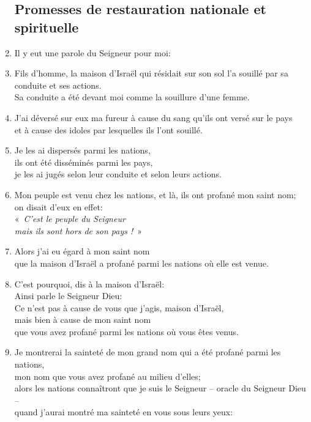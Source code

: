 \begin{enumerate}[leftmargin=\psleftmargin, labelsep = \pslabelsep, label={\arabic*}, font=\color{\pscolor}\small\textsuperscript, parsep=0em, itemsep=0em, topsep=0em ]
          \subsection*{Promesses de restauration nationale et spirituelle}
    \item Il y eut une parole du Seigneur pour moi:
    \item Fils d’homme, la maison d’Israël qui résidait sur son sol l’a souillé par sa conduite et ses actions. \\ Sa conduite a été devant moi comme la souillure d’une femme.
    \item J’ai déversé sur eux ma fureur à cause du sang qu’ils ont versé sur le pays \\ et à cause des idoles par lesquelles ils l’ont souillé.
    \item Je les ai dispersés parmi les nations, \\ ils ont été disséminés parmi les pays, \\ je les ai jugés selon leur conduite et selon leurs actions.
    \item Mon peuple est venu chez les nations, et là, ils ont profané mon saint nom; \\ on disait d’eux en effet: \\ \decalage «~\textit{C’est le peuple du Seigneur \\ \decalage mais ils sont hors de son pays !}~»
    \item Alors j’ai eu égard à mon saint nom \\ que la maison d’Israël a profané parmi les nations où elle est venue. \parSpace
    \item C’est pourquoi, dis à la maison d’Israël: \\ Ainsi parle le Seigneur Dieu: \\ Ce n’est pas à cause de vous que j’agis, maison d’Israël, \\ mais bien à cause de mon saint nom \\ que vous avez profané parmi les nations où vous êtes venus.
    \item Je montrerai la sainteté de mon grand nom qui a été profané parmi les nations, \\ mon nom que vous avez profané au milieu d’elles; \\ alors les nations connaîtront que je suis le Seigneur – oracle du Seigneur Dieu – \\ quand j’aurai montré ma sainteté en vous sous leurs yeux:

\end{enumerate}
